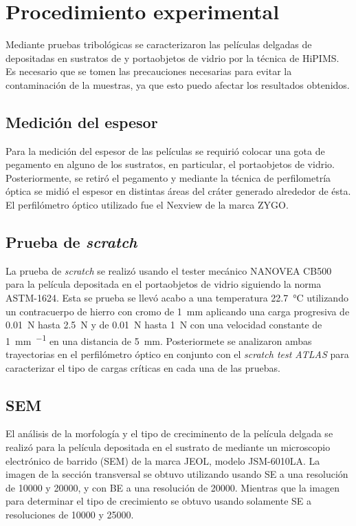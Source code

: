 \documentclass[12pt]{IEEEtran}
\begin{document}
\section{Procedimiento experimental}

Mediante pruebas tribológicas se caracterizaron las películas delgadas de  depositadas en sustratos de  y portaobjetos de vidrio por la técnica de HiPIMS. Es necesario que se tomen las precauciones necesarias para evitar la contaminación de la muestras, ya que esto puedo afectar los resultados obtenidos.

\subsection{Medición del espesor}

Para la medición del espesor de las películas se requirió colocar una gota de pegamento en alguno de los sustratos, en particular, el portaobjetos de vidrio. Posteriormente, se retiró el pegamento y mediante la técnica de perfilometría óptica se midió el espesor en distintas áreas del cráter generado alrededor de ésta. El perfilómetro óptico utilizado fue el Nexview de la marca ZYGO.

\subsection{Prueba de \emph{scratch}}

La prueba de \emph{scratch} se realizó usando el tester mecánico NANOVEA CB500 para la película depositada en el portaobjetos de vidrio siguiendo la norma ASTM-1624\cite{internationalStandardTestMethod}. Esta se prueba se llevó acabo a una temperatura \qty{22.7}{\degreeCelsius} utilizando un contracuerpo de hierro con cromo de \qty{1}{\mm} aplicando una carga progresiva de \qty{0.01}{\N} hasta \qty{2.5}{\N} y de \qty{0.01}{\N} hasta \qty{1}{\N} con una velocidad constante de \qty{1}{\mm\per\min} en una distancia de \qty{5}{\mm}. Posteriormete se analizaron ambas trayectorias en el perfilómetro óptico en conjunto con el \emph{scratch test ATLAS} para caracterizar el tipo de cargas críticas en cada una de las pruebas.

\subsection{SEM}

El análisis de la morfología y el tipo de creciminento de la película delgada se realizó para la película depositada en el sustrato de  mediante un microscopio electrónico de barrido (SEM) de la marca JEOL, modelo JSM-6010LA. La imagen de la sección transversal se obtuvo utilizando usando SE a una resolución de \num{10000} y \num{20000}, y con BE a una resolución de \num{20000}. Mientras que la imagen para determinar el tipo de crecimiento se obtuvo usando solamente SE a resoluciones de \num{10000} y \num{25000}.
\end{document}
